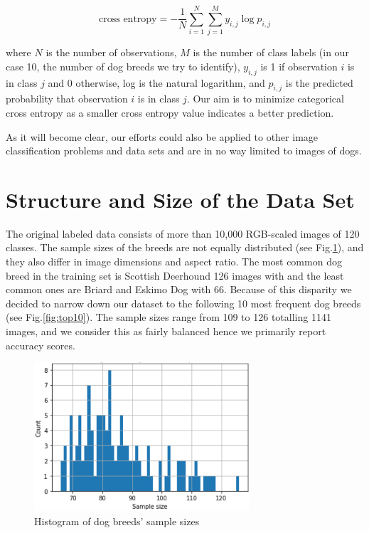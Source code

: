 \documentclass[11pt,titlepage,oneside,openany]{article}
\begin{document}
\begin{displaymath}
\text{cross entropy} = -\dfrac{1}{N} \sum_{i=1}^{N} \sum_{j=1}^{M} y_{i,j} \log{p_{i,j}}  
\end{displaymath}

where $N$ is the number of observations, $M$ is the number of class labels (in our case 10, the number of dog breeds we try to identify), $y_{i, j}$ is 1 if observation $i$ is in class $j$ and 0 otherwise, log is the natural logarithm, and $p_{i,j}$ is the predicted probability that observation $i$ is in class $j$. Our aim is to minimize categorical cross entropy as a smaller cross entropy value indicates a better prediction.

As it will become clear, our efforts could also be applied to other image classification problems and data sets and are in no way limited to images of dogs.


\section{Structure and Size of the Data Set}
\label{sec:struc}

The original labeled data consists of more than 10,000 RGB-scaled images of 120 classes. The sample sizes of the breeds are not equally distributed (see Fig.\ref{fig:histo}), and they also differ in image dimensions and aspect ratio. The most common dog breed in the training set is Scottish Deerhound 126 images with and the least common ones are Briard and Eskimo Dog with 66. Because of this disparity we decided to narrow down our dataset to the following 10 most frequent dog breeds (see Fig.\ref{fig:top10}). The sample sizes range from 109 to 126 totalling 1141 images, and we consider this as fairly balanced hence we primarily report accuracy scores. 

\begin{figure}[h]
	\vspace{-10pt}
	\centering
	\includegraphics[width=8cm]{histo}
	\caption{Histogram of dog breeds' sample sizes}
	\label{fig:histo}
\end{figure}
\end{document}
